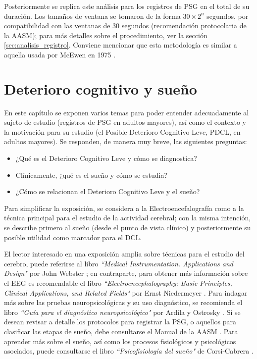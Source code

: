 \documentclass[12pt,letterpaper]{book}
\begin{document}
Posteriormente se replica este análisis para los registros de PSG en el total de su duración.
%
Los tamaños de ventana se tomaron de la forma $30 \times 2^{n}$ segundos, por compatibilidad con las ventanas de 30 segundos (recomendación protocolaria de la AASM); para más detalles sobre el procedimiento, ver la sección \ref{sec:analisis_registro}. 
%
Conviene mencionar que esta metodología es similar a aquella usada por McEwen en 1975 \cite{McEwen75}.


\chapter{Deterioro cognitivo y sueño}

En este capítulo se exponen varios temas para poder entender adecuadamente al sujeto de estudio (registros de PSG en adultos mayores), así como el contexto y la motivación para su estudio (el Posible Deterioro Cognitivo Leve, PDCL, en adultos mayores).
%
Se responden, de manera muy breve, las siguientes preguntas:
\begin{itemize}
\item ¿Qué es el Deterioro Cognitivo Leve y cómo se diagnostica?
\item Clínicamente, ¿qué es el sueño y cómo se estudia?
\item ¿Cómo se relacionan el Deterioro Cognitivo Leve y el sueño?
\end{itemize}

Para simplificar la exposición, se considera a la Electroencefalografía como a la técnica principal para el estudio de la actividad cerebral;
%
con la misma intención, se describe primero al sueño (desde el punto de vista clínico) y posteriormente su posible utilidad como marcador para el DCL.

El lector interesado en una exposición amplia sobre técnicas para el estudio del cerebro, puede referirse al libro \textit{``Medical Instrumentation. Applications and Design"} por John Webster \cite{Webster}; en contraparte, para obtener más información sobre el EEG es recomendable el libro \textit{``Electroencephalography: Basic Principles, Clinical Applications, and Related Fields"} por Ernst Niedermeyer \cite{niedermeyer}.
%
Para indagar más sobre las pruebas neuropsicológicas y su uso diagnóstico, se recomienda el libro \textit{``Guía para el diagnóstico neuropsicológico"} por Ardila y Ostrosky \cite{Ardila12}.
%
Si se desean revisar a detalle los protocolos para registrar la PSG, o aquellos para clasificar las etapas de sueño, debe consultarse el Manual de la AASM \cite{AASM07}.
%
Para aprender más sobre el sueño, así como los procesos fisiológicos y psicológicos asociados, puede consultarse el libro \textit{``Psicofisiología del sueño"} de Corsi-Cabrera \cite{Corsi1983}.
\end{document}
